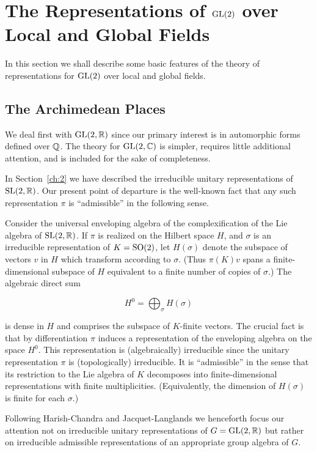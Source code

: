 \chapter{The Representations of \texorpdfstring{$\operatorname{GL}(2)$}{GL(2)} over Local and Global Fields}

\label{ch:4}
\label{ch:4}

In this section we shall describe some basic features of the theory of representations for $\operatorname{GL}(2)$ over local and global fields.

\section{The Archimedean Places}\label{sec:4a}

We deal first with $\operatorname{GL}(2,\mathbb{R})$ since our primary interest is in automorphic forms defined over $\mathbb{Q}$. The theory for $\operatorname{GL}(2,\mathbb{C})$ is simpler, requires little additional attention, and is included for the sake of completeness.

In Section~\ref{ch:2} we have described the irreducible unitary representations of $\operatorname{SL}(2,\mathbb{R})$. Our present point of departure is the well-known fact that any such representation $\pi$ is ``admissible'' in the following sense.

Consider the universal enveloping algebra of the complexification of the Lie algebra of $\operatorname{SL}(2,\mathbb{R})$. If $\pi$ is realized on the Hilbert space $H$, and $\sigma$ is an irreducible representation of $K = \operatorname{SO}(2)$, let $H(\sigma)$ denote the subspace of vectors $v$ in $H$ which transform according to $\sigma$. (Thus $\pi(K)v$ spans a finite-dimensional subspace of $H$ equivalent to a finite number of copies of $\sigma$.) The algebraic direct sum

\[
H^0 = \bigoplus_{\sigma} H(\sigma)
\]

is dense in $H$ and comprises the subspace of $K$-finite vectors. The crucial fact is that by differentiation $\pi$ induces a representation of the enveloping algebra on the space $H^0$. This representation is (algebraically) irreducible since the unitary representation $\pi$ is (topologically) irreducible. It is ``admissible'' in the sense that its restriction to the Lie algebra of $K$ decomposes into finite-dimensional representations with finite multiplicities. (Equivalently, the dimension of $H(\sigma)$ is finite for each $\sigma$.)

Following Harish-Chandra and Jacquet-Langlands we henceforth focus our attention not on irreducible unitary representations of $G = \operatorname{GL}(2,\mathbb{R})$ but rather on irreducible admissible representations of an appropriate group algebra of $G$.

